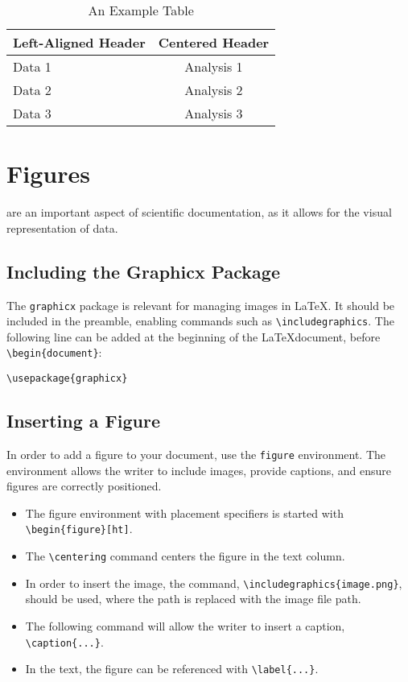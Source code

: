 \documentclass[12pt,journal,compsoc]{IEEEtran}
\begin{document}
\begin{table}[h]
\centering
\caption{An Example Table}
\label{tab:example}
\begin{tabular}{|l|c|}
\hline
\textbf{Left-Aligned Header} & \textbf{Centered Header} \\ \hline
Data 1                       & Analysis 1            \\ \hline
Data 2                       & Analysis 2            \\ \hline
Data 3                       & Analysis 3            \\ \hline
\end{tabular}
\end{table}

\section{Figures}
 are an important aspect of scientific documentation, as it allows for the visual representation of data.  

\subsection{Including the Graphicx Package}
The \texttt{graphicx} package is relevant for managing images in \LaTeX. It should be included in the preamble, enabling commands such as \texttt{\textbackslash includegraphics}. The following line can be added at the beginning of the \LaTeX document, before \texttt{\textbackslash begin\{document\}}:
\begin{verbatim}
\usepackage{graphicx}
\end{verbatim}

\subsection{Inserting a Figure}
In order to add a figure to your document, use the \texttt{figure} environment. The environment allows the writer to include images, provide captions, and ensure figures are correctly positioned.

\begin{itemize}
  \item The figure environment with placement specifiers is started with \texttt{\textbackslash begin\{figure\}[ht]}. 
  \item The \texttt{\textbackslash centering} command centers the figure in the text column.
  \item In order to insert the image, the command, \texttt{\textbackslash includegraphics\{image.png\}}, should be used, where the path is replaced with the image file path. 
  \item The following command will allow the writer to insert a caption, \texttt{\textbackslash caption\{...\}}.
  \item In the text, the figure can be referenced with \texttt{\textbackslash label\{...\}}.
\end{itemize}
\end{document}

